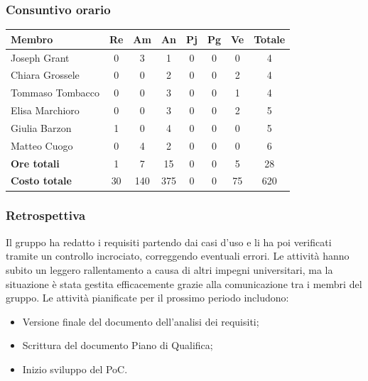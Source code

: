 \documentclass[11pt,a4paper]{article}
\begin{document}
\subsubsection{Consuntivo orario}
\begin{center}
    \begin{tabular}{|l|c|c|c|c|c|c|c|}
        \hline
        \textbf{Membro} & \textbf{Re} & \textbf{Am} & \textbf{An} & \textbf{Pj} & \textbf{Pg} & \textbf{Ve} & \textbf{Totale} \\
        \hline
        Joseph Grant & 0 & 3 & 1 & 0 & 0 & 0 & 4 \\
        \hline
        Chiara Grossele & 0 & 0 & 2 & 0 & 0 & 2 & 4 \\
        \hline
        Tommaso Tombacco & 0 & 0 & 3 & 0 & 0 & 1 & 4 \\
        \hline
        Elisa Marchioro & 0 & 0 & 3 & 0 & 0 & 2 & 5 \\
        \hline
        Giulia Barzon & 1 & 0 & 4 & 0 & 0 & 0 & 5 \\
        \hline
        Matteo Cuogo & 0 & 4 & 2 & 0 & 0 & 0 & 6 \\
        \hline
        \textbf{Ore totali} & 1 & 7 & 15 & 0 & 0 & 5 & 28 \\
        \hline
        \textbf{Costo totale} & 30 & 140 & 375 & 0 & 0 & 75 & 620 \\
        \hline
    \end{tabular}
\end{center}

\subsubsection{Retrospettiva}
Il gruppo ha redatto i requisiti partendo dai casi d’uso e li ha poi verificati tramite un controllo incrociato, correggendo eventuali errori.
Le attività hanno subito un leggero rallentamento a causa di altri impegni universitari, ma la situazione è stata gestita efficacemente grazie alla comunicazione tra i membri del gruppo.
Le attività pianificate per il prossimo periodo includono:
\begin{itemize}
    \item Versione finale del documento dell'analisi dei requisiti;
    \item Scrittura del documento Piano di Qualifica;
    \item Inizio sviluppo del PoC.
\end{itemize}

\newpage
\end{document}
